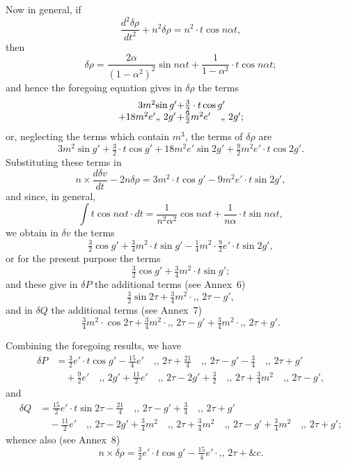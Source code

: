 \documentclass[11pt,a4paper]{article}
\newcommand{\mypar}{\par\medskip\noindent}
\begin{document}
\mypar
Now in general, if
\[
\frac{d^2\delta\rho}{dt^2} + n^2\delta\rho = n^2 \cdot t\cos n\alpha t,
\]
then
\[
\delta\rho = \frac{2\alpha}{(1-\alpha^2)^2}\sin n\alpha t + \frac{1}{1-\alpha^2} \cdot t\cos n\alpha t;
\]
and hence the foregoing equation gives in $\delta\rho$ the terms
\[
\begin{array}{r@{}l@{}l}
3m^2 & \sin g' & + \tfrac{3}{2} \cdot t\cos g'\\
+ 18m^2e' & \text{,, } 2g' & + \tfrac{9}{2}m^2e' \quad \text{,, } 2g';
\end{array}
\]
or, neglecting the terms which contain $m^3$, the terms of $\delta\rho$ are
\[
3m^2 \sin g' + \tfrac{3}{2} \cdot t\cos g' + 18m^2e' \sin 2g' + \tfrac{9}{2}m^2e' \cdot t\cos 2g'.
\]
Substituting these terms in
\[
n \times \frac{d\delta v}{dt} - 2n\delta\rho = 3m^2 \cdot t\cos g' - 9m^2e' \cdot t\sin 2g',
\]
and since, in general,
\[
\int t\cos n\alpha t \cdot dt = \frac{1}{n^2\alpha^2}\cos n\alpha t + \frac{1}{n\alpha} \cdot t\sin n\alpha t,
\]
we obtain in $\delta v$ the terms
\[
\tfrac{3}{2}\cos g' + \tfrac{3}{4}m^2 \cdot t\sin g'
- \tfrac{1}{4}m^2 \cdot \tfrac{9}{2}e' \cdot t\sin 2g',
\]
or for the present purpose the terms
\[
\tfrac{3}{2}\cos g' + \tfrac{3}{4}m^2 \cdot t\sin g';
\]
and these give in $\delta P$ the additional terms (see Annex~6)
\[
\tfrac{3}{2}\sin 2\tau + \tfrac{3}{4}m^2 \cdot \text{,, } 2\tau - g',
\]
and in $\delta Q$ the additional terms (see Annex~7)
\[
\tfrac{3}{4}m^2 \cdot \cos 2\tau + \tfrac{3}{4}m^2 \cdot \text{,, } 2\tau - g'
+ \tfrac{3}{4}m^2 \cdot \text{,, } 2\tau + g'.
\]

\mypar
Combining the foregoing results, we have
\begin{align*}
\delta P &= \tfrac{3}{2}e' \cdot t\cos g' - \tfrac{15}{4}e' \quad \text{,, } 2\tau
 + \tfrac{21}{4} \quad \text{,, } 2\tau - g'
 - \tfrac{3}{4} \quad \text{,, } 2\tau + g'\\
&\quad + \tfrac{9}{2}e' \quad \text{,, } 2g'
 + \tfrac{11}{2}e' \quad \text{,, } 2\tau - 2g'
 + \tfrac{3}{2} \quad \text{,, } 2\tau
 + \tfrac{3}{4}m^2 \quad \text{,, } 2\tau - g',
\end{align*}
and
\begin{align*}
\delta Q &= \tfrac{15}{2}e' \cdot t\sin 2\tau
 - \tfrac{21}{4} \quad \text{,, } 2\tau - g'
 + \tfrac{3}{4} \quad \text{,, } 2\tau + g'\\
&\quad - \tfrac{11}{2}e' \quad \text{,, } 2\tau - 2g'
 + \tfrac{3}{4}m^2 \quad \text{,, } 2\tau
 + \tfrac{3}{4}m^2 \quad \text{,, } 2\tau - g'
 + \tfrac{3}{4}m^2 \quad \text{,, } 2\tau + g';
\end{align*}
whence also (see Annex~8)
\[
n \times \delta\rho = \tfrac{3}{2}e' \cdot t\cos g' - \tfrac{15}{4}e' \cdot \text{,, } 2\tau
+ \&\mathrm{c}.
\]
\end{document}
